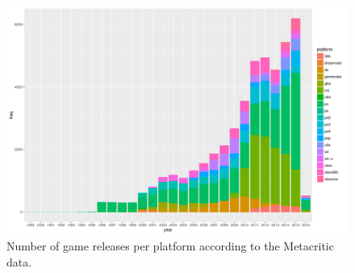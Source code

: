 
\begin{figure}[!t]
	\centering
	\includegraphics[width=1.0\columnwidth]{images/releases-per-year.pdf}
	\caption{Number of game releases per platform according to the Metacritic data.}
\label{fig:releases-per-year}
\end{figure}




